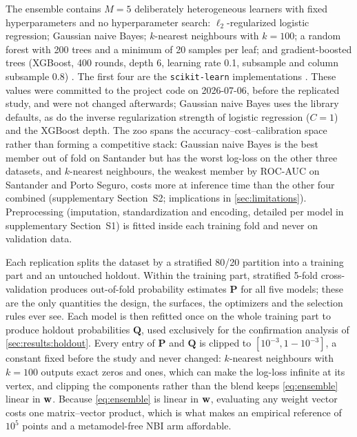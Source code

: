 The ensemble contains $M = 5$ deliberately heterogeneous learners with fixed hyperparameters and no hyperparameter
search: $\ell_2$-regularized logistic regression; Gaussian naive Bayes; $k$-nearest neighbours with $k = 100$; a
random forest with 200 trees and a minimum of 20 samples per leaf; and gradient-boosted trees (XGBoost, 400 rounds,
depth 6, learning rate 0.1, subsample and column subsample 0.8) \citep{chen2016xgboost}. The first four are the
\texttt{scikit-learn} implementations \citep{pedregosa2011scikit}. These values were committed to the project code on
2026-07-06, before the replicated study, and were not changed afterwards; Gaussian naive Bayes uses the library
defaults, as do the inverse regularization strength of logistic regression ($C = 1$) and the XGBoost depth. The zoo
spans the accuracy--cost--calibration space rather than forming a competitive stack: Gaussian naive Bayes is the best
member out of fold on Santander but has the worst log-loss on the other three datasets, and $k$-nearest neighbours,
the weakest member by ROC-AUC on Santander and Porto Seguro, costs more at inference time than the other four
combined (supplementary Section~S2; implications in \cref{sec:limitations}). Preprocessing (imputation,
standardization and encoding, detailed per model in supplementary Section~S1) is fitted inside each training fold and
never on validation data.

Each replication splits the dataset by a stratified 80/20 partition into a training part and an untouched holdout.
Within the training part, stratified 5-fold cross-validation produces out-of-fold probability estimates $\mathbf{P}$
for all five models; these are the only quantities the design, the surfaces, the optimizers and the selection rules
ever see. Each model is then refitted once on the whole training part to produce holdout probabilities $\mathbf{Q}$,
used exclusively for the confirmation analysis of \cref{sec:results:holdout}. Every entry of $\mathbf{P}$ and
$\mathbf{Q}$ is clipped to $[10^{-3}, 1-10^{-3}]$, a constant fixed before the study and never changed: $k$-nearest
neighbours with $k = 100$ outputs exact zeros and ones, which can make the log-loss infinite at its vertex, and
clipping the components rather than the blend keeps \cref{eq:ensemble} linear in $\mathbf{w}$. Because \cref{eq:ensemble} is linear in
$\mathbf{w}$, evaluating any weight vector costs one matrix--vector product, which is what makes an empirical reference of
$10^{5}$ points and a metamodel-free NBI arm affordable.

